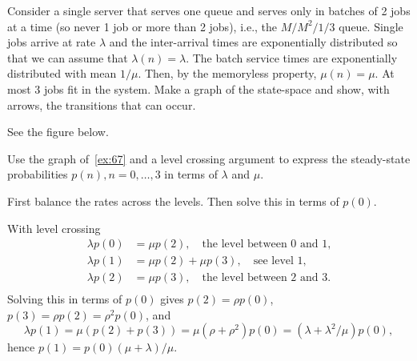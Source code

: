 \begin{exercise}
Consider a single server that serves one queue and serves only in batches of 2 jobs at a time (so never 1 job or more than 2 jobs), i.e., the $M/M^2/1/3$ queue.
  Single jobs arrive at rate $\lambda$ and the inter-arrival times are exponentially distributed so that we can assume that $\lambda(n) = \lambda$.
  The batch service times are exponentially distributed with mean $1/\mu$.
  Then, by the memoryless property, $\mu(n) = \mu$.
  At most 3 jobs fit in the system.
  Make a graph of the state-space and show, with arrows, the transitions that can occur.

\begin{solution}
See the figure below.

\end{solution}
\end{exercise}

\begin{exercise}
  Use the graph of~\cref{ex:67} and a level crossing argument to express the steady-state probabilities $p(n), n=0,\ldots, 3$ in terms of $\lambda$ and $\mu$.
\begin{hint}
First balance the rates across the levels. Then solve this in terms of $p(0)$.
\end{hint}
\begin{solution}
With level crossing
  \begin{align*}
    \lambda p(0)  &= \mu p(2), \quad\text{the level between 0 and 1,}\\
    \lambda p(1)  &= \mu p(2) +\mu p(3), \quad\text{see level 1,}\\
    \lambda p(2)  &= \mu p(3), \quad\text{the level between 2 and 3.}\\
  \end{align*}
  Solving this in terms of $p(0)$ gives $p(2) = \rho p(0)$, $p(3) = \rho p(2) = \rho^2p(0)$, and
  \begin{equation*}
    \lambda p(1) = \mu(p(2) + p(3)) = \mu (\rho + \rho^2) p(0) = (\lambda + \lambda^2/\mu) p(0),
  \end{equation*}
hence $p(1) = p(0)(\mu + \lambda)/\mu$. 
\end{solution}
\end{exercise}


